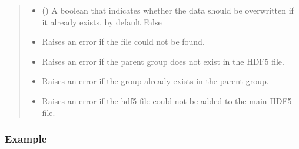 \documentclass[letterpaper,10pt,english]{sphinxmanual}
\begin{document}
\begin{fulllineitems}
\begin{fulllineitems}
\begin{quote}
\begin{description}
\begin{itemize}
\item {} 
\sphinxAtStartPar
{} (\sphinxstyleliteralemphasis{\sphinxupquote{, }}) \textendash{} A boolean that indicates whether the data should be overwritten if it already exists, by default False

\end{itemize}

\begin{itemize}
\item {} 
\sphinxAtStartPar
{} \textendash{} Raises an error if the file could not be found.

\item {} 
\sphinxAtStartPar
{} \textendash{} Raises an error if the parent group does not exist in the HDF5 file.

\item {} 
\sphinxAtStartPar
{} \textendash{} Raises an error if the group already exists in the parent group.

\item {} 
\sphinxAtStartPar
{\hyperref[\detokenize{_autosummary/HDF5_BLS.WrapperError:HDF5_BLS.WrapperError}]{}} \textendash{} Raises an error if the hdf5 file could not be added to the main HDF5 file.

\end{itemize}

\end{description}\end{quote}
\subsubsection*{Example}

\begin{sphinxVerbatim}[commandchars=\\\{\}]
   
  
\end{sphinxVerbatim}


\end{fulllineitems}
\end{fulllineitems}
\end{document}
